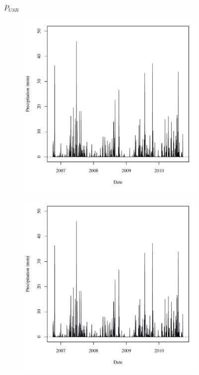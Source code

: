 \begin{linenumbers}
\subfiguretop
\begin{landscape}
	\begin{figure}
		\centering
		$ \displaystyle \overline{P}_{USR} $
		\begin{subfigure}{0.7\textwidth}
			\centering
			\includegraphics[width=\tableCustomSize]{"Figures/Results_USR/Deterministic/A Precip"}
		\end{subfigure}%
		\begin{subfigure}{0.7\textwidth}
			\centering
			\includegraphics[width=\tableCustomSize]{"Figures/Results_USR/Stochastic/A Precip"}

\end{subfigure}
\end{figure}
\end{landscape}
\end{linenumbers}
